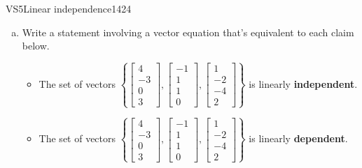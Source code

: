 \begin{exercise}{VS5}{Linear independence}{1424} 
\begin{exerciseStatement} 

\begin{enumerate}[(a)]
\item  

 Write a statement involving a vector equation that's equivalent to each claim below. 

 

\begin{itemize}
\item  

 The set of vectors \(\left\{ \left[\begin{array}{c}
4 \\
-3 \\
0 \\
3
\end{array}\right] , \left[\begin{array}{c}
-1 \\
1 \\
1 \\
0
\end{array}\right] , \left[\begin{array}{c}
1 \\
-2 \\
-4 \\
2
\end{array}\right] \right\}\) is linearly \textbf{independent}. 

 
\item  

 The set of vectors \(\left\{ \left[\begin{array}{c}
4 \\
-3 \\
0 \\
3
\end{array}\right] , \left[\begin{array}{c}
-1 \\
1 \\
1 \\
0
\end{array}\right] , \left[\begin{array}{c}
1 \\
-2 \\
-4 \\
2
\end{array}\right] \right\}\) is linearly \textbf{dependent}. 

 
\end{itemize}


\end{enumerate}
\end{exerciseStatement}
\end{exercise}
